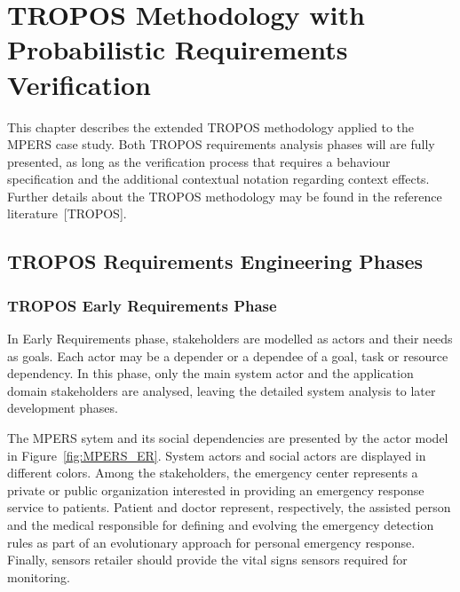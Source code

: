 \chapter{TROPOS Methodology with Probabilistic Requirements Verification}\label{ch_proposal}

This chapter describes the extended TROPOS methodology applied to the MPERS case study. Both TROPOS requirements analysis phases will are fully presented, as long as the verification process that requires a behaviour specification and the additional contextual notation regarding context effects. Further details about the TROPOS methodology may be found in the reference literature~[TROPOS]. 

\section{TROPOS Requirements Engineering Phases}

\subsection{TROPOS Early Requirements Phase}

In Early Requirements phase, stakeholders are modelled as actors and their needs as goals. Each actor may be a depender or a dependee of a goal, task or resource dependency. In this phase, only the main system actor and the application domain stakeholders are analysed, leaving the detailed system analysis to later development phases.

The MPERS sytem and its social dependencies are presented by the actor model in Figure~\ref{fig:MPERS_ER}. System actors and social actors are displayed in different colors. Among the stakeholders, the emergency center represents a private or public organization interested in providing an emergency response service to patients. Patient and doctor represent, respectively, the assisted person and the medical responsible for defining and evolving the emergency detection rules as part of an evolutionary approach for personal emergency response. Finally, sensors retailer should provide the vital signs sensors required for monitoring.

